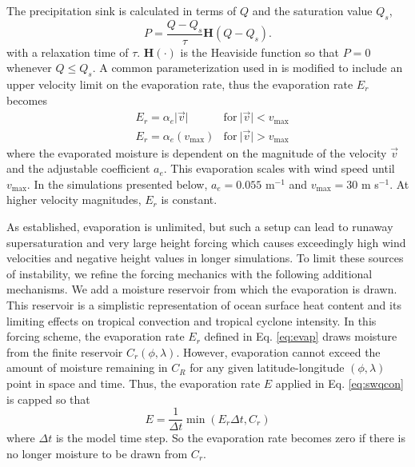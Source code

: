 \documentclass{ametsoc}
\begin{document}
   The precipitation sink is calculated in terms of $Q$ and the saturation value $Q_s$,
   \begin{equation}
     \label{eq:precip} P = \frac{Q-Q_s}{\tau}\mathbf{H}(Q-Q_s).
   \end{equation}
   with a relaxation time of $\tau$. $\mathbf{H}(\cdot)$ is the Heaviside function
    so that $P = 0$ whenever $Q \leq Q_s$.
   A common parameterization used in \cite{lahaye2016understanding} is modified
   to include an upper velocity limit on the evaporation rate, thus the evaporation rate $E_r$ becomes
     \begin{align}
        \label{eq:evap} 
     &E_r  =   \alpha_e  \lvert \vec{v} \rvert & \mathrm{for} \ \lvert \vec{v} \rvert < v_\mathrm{max} \nonumber \\
     &E_r  =   \alpha_e (v_\mathrm{max}) &  \mathrm{for} \ \lvert \vec{v} \rvert > v_\mathrm{max} 
     \end{align}
   where the evaporated moisture is dependent on the magnitude of the 
   velocity $\vec{v}$ and the adjustable coefficient $a_e$. This evaporation scales 
   with wind speed until $v_{\mathrm{max}}$. In the simulations presented below,
   $a_e = 0.055$ m$^{-1}$ and $v_{\mathrm{max}} = 30$ m s$^{-1}$.
   At higher velocity magnitudes, $E_r$ is constant.
   
   As established, evaporation is unlimited, but such a setup can lead to runaway 
   supersaturation and very large height forcing which causes exceedingly high wind 
   velocities and negative height values in longer simulations.
   To limit these sources of instability, we refine the forcing mechanics with the following additional mechanisms.
   We add a moisture reservoir from which the evaporation is drawn. This reservoir is a simplistic representation of
   ocean surface heat content and its limiting effects on tropical convection and tropical cyclone intensity.
   In this forcing scheme, the evaporation rate $E_r$ defined in Eq. \ref{eq:evap} draws moisture from the finite reservoir 
    $C_r(\phi,\lambda)$. However, evaporation cannot exceed the amount
    of moisture remaining in $C_R$ for any given latitude-longitude $(\phi,\lambda)$ point in space and time.
    Thus, the evaporation rate $E$ applied in Eq. \ref{eq:swqcon} is capped so that
    \begin{equation}
      \label{eq:crlimit}
         E = \frac{1}{\Delta t}\min\left(E_r \Delta t, C_r\right)
    \end{equation}
   where $\Delta t$ is the model time step. So the evaporation 
   rate becomes zero if there is no longer moisture to be drawn from $C_r$.
\end{document}

